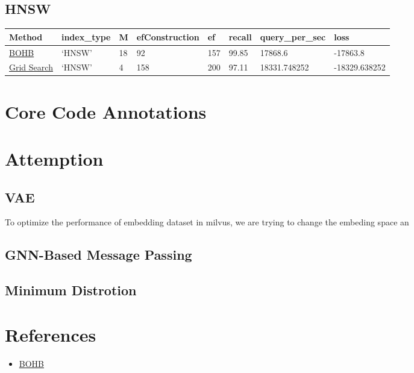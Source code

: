 \hypertarget{hnsw}{%
\subsection{HNSW}\label{hnsw}}

\begin{longtable}[]{@{}llllllll@{}}
\toprule
Method & index\_type & M & efConstruction & ef & recall &
query\_per\_sec & loss \\
\midrule
\endhead
\href{https://wandb.ai/xiang-pan/HOBO/runs/1gkilnbh}{BOHB} & `HNSW' & 18
& 92 & 157 & 99.85 & 17868.6 & -17863.8 \\
\href{https://wandb.ai/xiang-pan/HOBO/runs/3vdvm6gs}{Grid Search} &
`HNSW' & 4 & 158 & 200 & 97.11 & 18331.748252 & -18329.638252 \\
\bottomrule
\end{longtable}

\hypertarget{core-code-annotations}{%
\section{Core Code Annotations}\label{core-code-annotations}}

\hypertarget{section-1}{%
\subsection{}\label{section-1}}

\hypertarget{attemption}{%
\section{Attemption}\label{attemption}}

\hypertarget{vae}{%
\subsection{VAE}\label{vae}}

To optimize the performance of embedding dataset in milvus, we are
trying to change the embeding space an

\hypertarget{gnn-based-message-passing}{%
\subsection{GNN-Based Message Passing}\label{gnn-based-message-passing}}

\hypertarget{minimum-distrotion}{%
\subsection{Minimum Distrotion}\label{minimum-distrotion}}

\hypertarget{references}{%
\section{References}\label{references}}

\hypertarget{refer-anchor-1}{}

\begin{itemize}
\tightlist
\item
  \href{https://arxiv.org/pdf/1807.01774.pdf}{BOHB}
\end{itemize}
